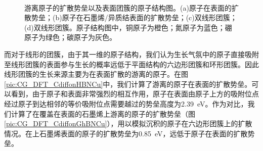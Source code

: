     \begin{figure}[htb]
        \\[-0.0ex]
        \caption{游离原子的扩散势垒以及表面团簇的原子结构图。(a)原子在表面的扩散势垒；(b)原子在石墨烯/异质结表面的扩散势垒；(c)双线形团簇；(d)双线形团簇。原子结构图中，铜原子为橙色；氮原子为蓝色；硼原子为绿色；碳原子为灰色。}
        \label{}
    \end{figure}

    而对于线形的团簇，由于其一维的原子结构，我们认为生长气氛中的原子直接吸附至线形团簇的表面参与生长的概率远低于平面结构的六边形团簇和环形团簇。因此线形团簇的生长来源主要为在表面扩散的游离的原子。在图\ref{pic:CG_DFT_CdiffonHBNCu}中，我们计算了游离的原子在表面的扩散势垒。可以看到，由于原子和表面非常强烈的相互作用，原子在表面由原子上方的吸附位点经过原子到达相邻的等价吸附位点需要越过的势垒高度为\SI{2.39}{\electronvolt}。作为对比，我们计算了在覆盖在表面的石墨烯上游离的原子的扩散势垒（图\ref{pic:CG_DFT_CdiffonGhBNCu}），用以模拟沉积的原子在六边形团簇上的扩散情况。在上石墨烯表面的原子的扩散势垒为\SI{0.85}{\electronvolt}，远低于原子在表面的扩散势垒。


